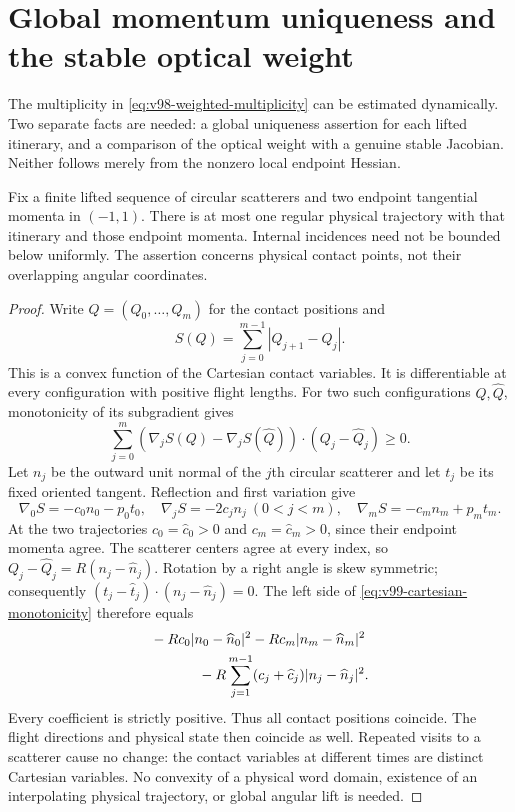 \section{Global momentum uniqueness and the stable optical weight}
\label{sec:v99-uniqueness}
The multiplicity in \eqref{eq:v98-weighted-multiplicity} can be
estimated dynamically. Two separate facts are needed: a global
uniqueness assertion for each lifted itinerary, and a comparison of
the optical weight with a genuine stable Jacobian. Neither follows
merely from the nonzero local endpoint Hessian.

\begin{theorem}
\label{thm:v99-unique}
Fix a finite lifted sequence of circular scatterers and two endpoint
tangential momenta in $(-1,1)$. There is at most one regular physical
trajectory with that itinerary and those endpoint momenta. Internal
incidences need not be bounded below uniformly. The assertion concerns
physical contact points, not their overlapping angular coordinates.
\end{theorem}
\begin{proof}
Write $Q=(Q_0,\ldots,Q_m)$ for the contact positions and
\[
                 S(Q)=\sum_{j=0}^{m-1}|Q_{j+1}-Q_j|.
\]
This is a convex function of the Cartesian contact variables. It is
differentiable at every configuration with positive flight lengths.
For two such configurations $Q,\widehat Q$, monotonicity of its
subgradient gives
\begin{equation}\label{eq:v99-cartesian-monotonicity}
 \sum_{j=0}^m
 (\nabla_j S(Q)-\nabla_j S(\widehat Q))\cdot(Q_j-\widehat Q_j)
                                                   \ge0.
\end{equation}
Let $n_j$ be the outward unit normal of the $j$th circular scatterer
and let $t_j$ be its fixed oriented tangent. Reflection and first
variation give
\[
 \nabla_0S=-c_0n_0-p_0t_0,\quad
 \nabla_jS=-2c_jn_j\ (0<j<m),\quad
 \nabla_mS=-c_mn_m+p_mt_m.
\]
At the two trajectories $c_0=\widehat c_0>0$ and
$c_m=\widehat c_m>0$, since their endpoint momenta agree. The
scatterer centers agree at every index, so
$Q_j-\widehat Q_j=R(n_j-\widehat n_j)$. Rotation by a right angle
is skew symmetric; consequently
$(t_j-\widehat t_j)\cdot(n_j-\widehat n_j)=0$.
The left side of \eqref{eq:v99-cartesian-monotonicity} therefore equals
\begin{align*}
 &-Rc_0|n_0-\widehat n_0|^2-Rc_m|n_m-\widehat n_m|^2\\
 &\hspace{12mm}-R\sum_{j=1}^{m-1}
                  (c_j+\widehat c_j)|n_j-\widehat n_j|^2.
\end{align*}
Every coefficient is strictly positive. Thus all contact positions
coincide. The flight directions and physical state then coincide as
well. Repeated visits to a scatterer cause no change: the contact
variables at different times are distinct Cartesian variables. No
convexity of a physical word domain, existence of an interpolating
physical trajectory, or global angular lift is needed.
\end{proof}

